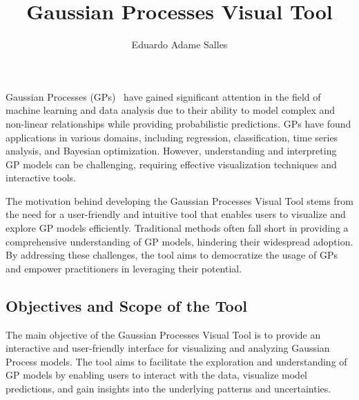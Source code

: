 \documentclass[preprint,journal]{vgtc}       %
\title{Gaussian Processes Visual Tool}
\author{Eduardo Adame Salles}
\begin{document}


\maketitle


Gaussian Processes (GPs)~\cite{rasmussen2006gaussian} have gained significant attention in the field of machine learning and data analysis due to their ability to model complex and non-linear relationships while providing probabilistic predictions. GPs have found applications in various domains, including regression, classification, time series analysis, and Bayesian optimization. However, understanding and interpreting GP models can be challenging, requiring effective visualization techniques and interactive tools.

The motivation behind developing the Gaussian Processes Visual Tool stems from the need for a user-friendly and intuitive tool that enables users to visualize and explore GP models efficiently. Traditional methods often fall short in providing a comprehensive understanding of GP models, hindering their widespread adoption. By addressing these challenges, the tool aims to democratize the usage of GPs and empower practitioners in leveraging their potential.

\subsection{Objectives and Scope of the Tool}

The main objective of the Gaussian Processes Visual Tool is to provide an interactive and user-friendly interface for visualizing and analyzing Gaussian Process models. The tool aims to facilitate the exploration and understanding of GP models by enabling users to interact with the data, visualize model predictions, and gain insights into the underlying patterns and uncertainties.
\end{document}
